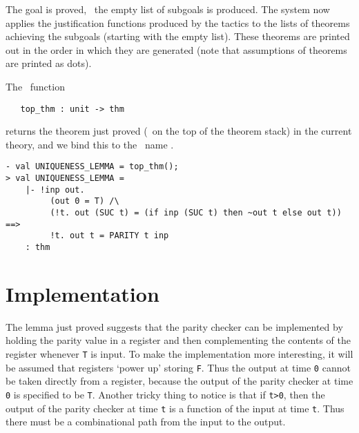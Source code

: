 \noindent The goal is proved, \ie\ the empty list of subgoals is produced.
The system now applies the justification functions produced by the
tactics to the lists of theorems achieving the subgoals (starting with
the empty list).  These theorems are printed out in the order in which
they are generated (note that assumptions of theorems are printed as
dots).

The \ML\ function

{\small\baselineskip\HOLSpacing\begin{verbatim}
   top_thm : unit -> thm
\end{verbatim}}

\noindent
returns the theorem just proved (\ie\ on the top of the theorem stack)
in the current theory, and we bind this to the \ML\ name
.

\begin{session}
\begin{verbatim}
- val UNIQUENESS_LEMMA = top_thm();
> val UNIQUENESS_LEMMA =
    |- !inp out.
         (out 0 = T) /\
         (!t. out (SUC t) = (if inp (SUC t) then ~out t else out t)) ==>
         !t. out t = PARITY t inp
    : thm
\end{verbatim}
\end{session}

\section{Implementation}
\label{implementation}

The lemma just proved suggests that the parity checker can be
implemented by holding the parity value in a register and then
complementing the contents of the register whenever {\small\verb|T|}
is input. To make the implementation more interesting, it will be
assumed that registers `power up' storing {\small\verb|F|}. Thus the
output at time {\small\verb|0|} cannot be taken directly from a
register, because the output of the parity checker at time
{\small\verb|0|} is specified to be {\small\verb|T|}. Another tricky
thing to notice is that if {\small\verb|t>0|}, then the output of the
parity checker at time {\small\verb|t|} is a function of the input at
time {\small\verb|t|}. Thus there must be a combinational path from
the input to the output.

